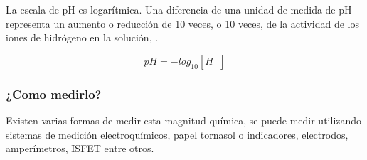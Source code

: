 La escala de pH es logarítmica. Una diferencia de una unidad de medida de pH representa un aumento o reducción de 10 veces, o 10 veces, de la actividad de los iones de hidrógeno en la solución, \cite{covington_definition_1985}.

\begin{equation} \label{ecuacionpH} 
pH=-log_{10}[H^{+}]
\end{equation}

\subsubsection{¿Como medirlo?}
Existen varias formas de medir esta magnitud qu\'imica, se puede medir utilizando sistemas de medici\'on electroqu\'imicos, papel tornasol o indicadores, electrodos, amper\'imetros, ISFET entre otros. 

